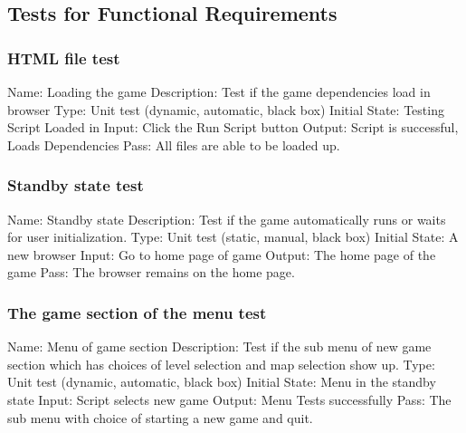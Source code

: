 \documentclass{article}
\begin{document}
\subsection{Tests for Functional Requirements}
\subsubsection{HTML file test}
Name:  Loading the game \newline
Description: Test if the game dependencies load in browser
\newline
Type: Unit test (dynamic, automatic, black box) \newline
Initial State:  Testing Script Loaded in \newline
Input: Click the Run Script button \newline
Output: Script is successful, Loads Dependencies \newline
Pass:  All files are able to be loaded up. \newline

\subsubsection{Standby state test}
Name:  Standby state\newline
Description: Test if the game automatically runs or waits
for user initialization. \newline
Type: Unit test (static, manual, black box) \newline
Initial State: A new browser \newline
Input: Go to home page of game \newline
Output: The home page of the game \newline
Pass: The browser remains on the home page. \newline

\subsubsection{The game section of the menu test}
Name: Menu of game section\newline
Description: Test if the sub menu of new game section which has choices of 
level selection and map selection show up.
\newline
Type: Unit test (dynamic, automatic, black box) \newline
Initial State: Menu in the standby state \newline
Input: Script selects new game \newline
Output:  Menu Tests successfully  \newline
Pass: The sub menu with choice of starting a new game and quit. \newline
\end{document}

